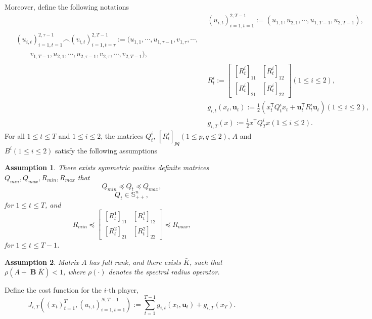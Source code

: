 \documentclass[letterpaper, 10 pt, conference]{ieeeconf}  %
\newcommand{\transpose}{\mathsf{T}}
\DeclareMathOperator{\contB}{\mathbf{B}}
\newtheorem{assumption}{Assumption}
\begin{document}
Moreover, define the following notations
\begin{align}
    &(u_{i,t})_{i=1,t=1}^{2,T-1} := (u_{1,1},u_{2,1},\cdots, u_{1,T-1},u_{2,T-1}),\\
    \begin{split}
         &(u_{i,t})_{i=1,t=1}^{2,\tau-1} \frown (v_{i,t})_{i=1,t=\tau}^{2,T-1}:=(u_{1,1},\cdots,u_{1,\tau-1},v_{1,\tau},\cdots,\\
    &\qquad v_{1,T-1},u_{2,1},\cdots,u_{2,\tau-1},v_{2,\tau},\cdots,v_{2,T-1} ),
    \end{split}
   \\ 
   & R_{t}^{i} := 
   \begin{bmatrix}
       [R_{t}^{i}]_{11} & [R_{t}^{i}]_{12}\\
       [R_{t}^{i}]_{21} & [R_{t}^{i}]_{22}
   \end{bmatrix}(1\leq i \leq 2),\\
    &g_{i,t}(x_{t}, \mathbf{u}_{t}) := \frac{1}{2}(x_{t}^{\mathsf{T}}Q_{t}^{i}x_{t} + 
    \mathbf{u}_{t}^{\transpose}R_{t}^{i}\mathbf{u}_{t})(1\leq i \leq 2),\\
    &g_{i,T}(x) := \frac{1}{2} x^{\mathsf{T}}Q_{T}^{i}x(1\leq i \leq 2).
\end{align}
For all $1 \leq t \leq T$ and $1\leq i\leq 2$, the matrices $Q_{t}^{i}$, $[R_{t}^{i}]_{pq}(1\leq p,q \leq 2)$, $A$ and $B^{i}(1\leq i \leq 2)$ satisfy the following assumptions
\begin{assumption}\label{assumption:bounds}
    There exists symmetric positive definite matrices $Q_{min}, Q_{max}, R_{min}, R_{max}$ that
    \begin{equation}
        Q_{min} \preceq Q_{t} \preceq Q_{max},
    \end{equation}
    \begin{equation}
        Q_{t} \in \mathbb{S}^{n}_{++},
    \end{equation}
    for $1\leq t \leq T$, and
    \begin{equation}\label{eq:positiveR}
        R_{min} \preceq 
        \begin{bmatrix}
            [R_{t}^{1}]_{11} & [R_{t}^{1}]_{12}\\
            [R_{t}^{2}]_{21} & [R_{t}^{2}]_{22}
        \end{bmatrix}
        \preceq R_{max},
    \end{equation}
    for $1 \leq t \leq T-1$.
\end{assumption}
\begin{assumption}\label{assumption:controllable}
    Matrix $A$ has full rank, and there exists $\bar{K}$, such that $\rho(A + \contB \bar{K}) < 1$, where $\rho(\cdot)$ denotes the spectral radius operator.
\end{assumption}
Define the cost function for the $i$-th player,
\begin{equation}\label{eq:LQcost}
    J_{i,T}((x_{t})_{t=1}^{T},(u_{i,t})_{i=1,t=1}^{N,T-1}) := \sum_{t=1}^{T-1} g_{i,t}(x_{t}, \mathbf{u}_{t}) + g_{i,T}(x_{T}).
\end{equation}
\end{document}
